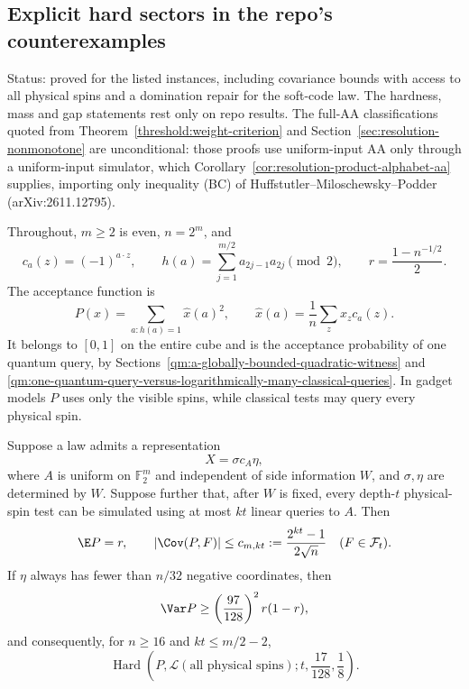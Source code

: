 \subsection{Explicit hard sectors in the repo's counterexamples}
\label{ian:hard-sector-instances}

Status: proved for the listed instances, including covariance bounds with access to all physical spins and a domination repair for the soft-code law. The hardness, mass and gap statements rest only on repo results. The full-AA classifications quoted from Theorem~\ref{threshold:weight-criterion} and Section~\ref{sec:resolution-nonmonotone} are unconditional: those proofs use uniform-input AA only through a uniform-input simulator, which Corollary~\ref{cor:resolution-product-alphabet-aa} supplies, importing only inequality (BC) of Huffstutler--Miloschewsky--Podder (arXiv:2611.12795).

Throughout, \(m\ge2\) is even, \(n=2^m\), and
\[
 c_a(z)=(-1)^{a\cdot z},\qquad
 h(a)=\sum_{j=1}^{m/2}a_{2j-1}a_{2j}\pmod2,
 \qquad r=\frac{1-n^{-1/2}}2.
\]
The acceptance function is
\[
 P(x)=\sum_{a:h(a)=1}\widehat x(a)^2,\qquad
 \widehat x(a)=\frac1n\sum_zx_zc_a(z).
\]
It belongs to \([0,1]\) on the entire cube and is the acceptance
probability of one quantum query, by
Sections~\ref{qm:a-globally-bounded-quadratic-witness} and
\ref{qm:one-quantum-query-versus-logarithmically-many-classical-queries}.
In gadget models \(P\) uses only the visible spins, while classical
tests may query every physical spin.

\begin{lemma}
\label{ian:hard-sector-orbit-covariance}
Suppose a law admits a representation
\[
 X=\sigma c_A\eta,
\]
where \(A\) is uniform on \(\mathbb F_2^m\) and independent of side
information \(W\), and \(\sigma,\eta\) are determined by \(W\).
Suppose further that, after \(W\) is fixed, every depth-\(t\)
physical-spin test can be simulated using at most \(kt\) linear
queries to \(A\). Then
\[
 \E P=r,\qquad
 |\Cov(P,F)|\le
 c_{m,kt}:=\frac{2^{kt}-1}{2\sqrt n}
 \quad(F\in\mathcal F_t).
\]
If \(\eta\) always has fewer than \(n/32\) negative coordinates, then
\[
 \Var P\ge\left(\frac{97}{128}\right)^2r(1-r),
\]
and consequently, for \(n\ge16\) and \(kt\le m/2-2\),
\[
 \operatorname{Hard}\left(
 P,\mathcal L(\text{all physical spins});
 t,\frac{17}{128},\frac18\right).
\]
\end{lemma}

